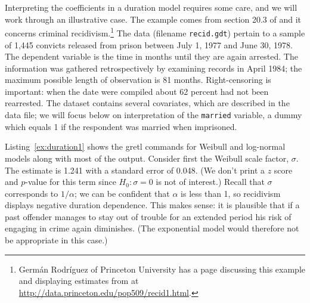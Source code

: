 Interpreting the coefficients in a duration model requires some care,
and we will work through an illustrative case. The example comes from
section 20.3 of \cite{wooldridge-panel} and it concerns criminal
recidivism.\footnote{Germ\'an Rodr\'iguez of Princeton University has a
  page discussing this example and displaying estimates from
   at \url{http://data.princeton.edu/pop509/recid1.html}.}
The data (filename \texttt{recid.gdt}) pertain to a sample of 1,445
convicts released from prison between July 1, 1977 and June 30,
1978. The dependent variable is the time in months until they are
again arrested. The information was gathered retrospectively by
examining records in April 1984; the maximum possible length of
observation is 81 months.  Right-censoring is important: when the date
were compiled about 62 percent had not been rearrested.  The dataset
contains several covariates, which are described in the data file; we
will focus below on interpretation of the \texttt{married} variable, a
dummy which equals 1 if the respondent was married when imprisoned.

Listing~\ref{ex:duration1} shows the gretl commands for Weibull and
log-normal models along with most of the output.  Consider first the
Weibull scale factor, $\sigma$. The estimate is 1.241 with a standard
error of 0.048.  (We don't print a $z$ score and $p$-value for this
term since $H_0: \sigma = 0$ is not of interest.)  Recall that
$\sigma$ corresponds to $1/\alpha$; we can be confident that $\alpha$
is less than 1, so recidivism displays negative duration dependence.
This makes sense: it is plausible that if a past offender manages to
stay out of trouble for an extended period his risk of engaging in
crime again diminishes. (The exponential model would therefore not be
appropriate in this case.)

